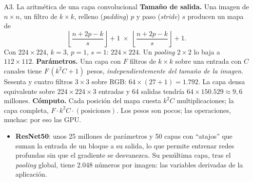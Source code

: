 \documentclass{beamer}
\newcommand{\1}{\mathbb{I}}
\begin{document}
\begin{frame}{A3. La aritmética de una capa convolucional}
\small
\textbf{Tamaño de salida.} Una imagen de $n \times n$, un filtro de $k \times k$, relleno (\emph{padding}) $p$ y paso (\emph{stride}) $s$ producen un mapa de
\[ \left\lfloor \frac{n + 2p - k}{s} \right\rfloor + 1 \;\times\; \left\lfloor \frac{n + 2p - k}{s} \right\rfloor + 1. \]
Con $224 \times 224$, $k = 3$, $p = 1$, $s = 1$: $224 \times 224$. Un \emph{pooling} $2 \times 2$ lo baja a $112 \times 112$.
\pause
\vspace{0.05cm}
\textbf{Parámetros.} Una capa con $F$ filtros de $k \times k$ sobre una entrada con $C$ canales tiene $F\,(k^2 C + 1)$ pesos, \emph{independientemente del tamaño de la imagen}. Sesenta y cuatro filtros $3 \times 3$ sobre RGB: $64 \times (27 + 1) = 1.792$. La capa densa equivalente sobre $224 \times 224 \times 3$ entradas y 64 salidas tendría $64 \times 150.529 \approx 9{,}6$ millones.
\pause
\vspace{0.05cm}
\textbf{Cómputo.} Cada posición del mapa cuesta $k^2 C$ multiplicaciones; la capa completa, $F \cdot k^2 C \cdot (\text{posiciones})$. Los pesos son pocos; las operaciones, muchas: por eso las GPU.
\pause
\begin{itemize}\itemsep2pt
  \item \textbf{ResNet50}: unos 25 millones de parámetros y 50 capas con ``atajos'' que suman la entrada de un bloque a su salida, lo que permite entrenar redes profundas sin que el gradiente se desvanezca. Su penúltima capa, tras el \emph{pooling} global, tiene 2.048 números por imagen: las variables derivadas de la aplicación.
\end{itemize}
\end{frame}
\end{document}

